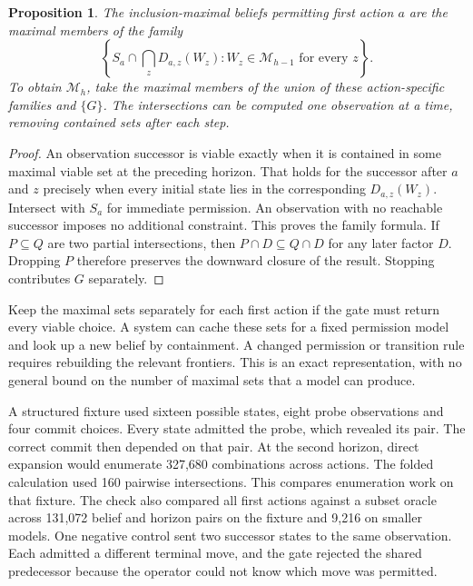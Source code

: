 \documentclass[11pt]{article}
\newtheorem{proposition}{Proposition}
\begin{document}
\begin{proposition}
The inclusion-maximal beliefs permitting first action $a$ are the
maximal members of the family
\[
 \left\{S_a\cap\bigcap_z D_{a,z}(W_z):
             W_z\in\mathcal M_{h-1}\text{ for every }z\right\}.
\]
To obtain $\mathcal M_h$, take the maximal members of the union of
these action-specific families and $\{G\}$. The intersections can
be computed one observation at a time, removing contained sets
after each step.
\end{proposition}
\begin{proof}
An observation successor is viable exactly when it is contained
in some maximal viable set at the preceding horizon. That holds
for the successor after $a$ and $z$ precisely when every initial
state lies in the corresponding $D_{a,z}(W_z)$. Intersect with
$S_a$ for immediate permission. An observation with no reachable
successor imposes no additional constraint. This proves the family
formula. If $P\subseteq Q$ are two partial intersections, then
$P\cap D\subseteq Q\cap D$ for any later factor $D$. Dropping
$P$ therefore preserves the downward closure of the result.
Stopping contributes $G$ separately.
\end{proof}

Keep the maximal sets separately for each first action if the gate
must return every viable choice. A system can cache these sets for a
fixed permission model and look up a new belief by containment. A
changed permission or transition rule requires rebuilding the relevant
frontiers. This is an exact representation, with no general bound on
the number of maximal sets that a model can produce.

A structured fixture used sixteen possible states, eight probe
observations and four commit choices. Every state admitted the probe,
which revealed its pair. The correct commit then depended on that
pair. At the second horizon, direct expansion would enumerate
327,680 combinations across actions. The folded calculation used
160 pairwise intersections. This compares enumeration work on that
fixture. The check also compared all first actions against a subset
oracle across 131,072 belief and horizon pairs on the fixture and
9,216 on smaller models. One negative control sent two successor
states to the same observation. Each admitted a different terminal
move, and the gate rejected the shared predecessor because the
operator could not know which move was permitted.
\end{document}
